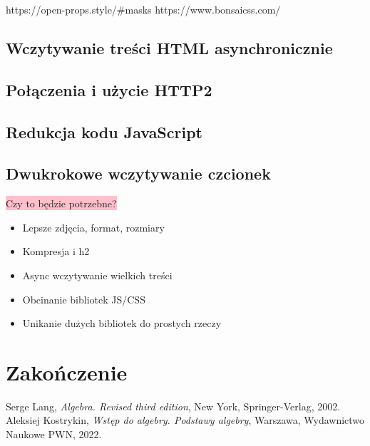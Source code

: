 \documentclass[licencjacka]{pracadypl}
\newcommand{\selfnote}[1]{\colorbox{pink}{#1}}
\begin{document}
https://open-props.style/\#masks
https://www.bonsaicss.com/




\section{Wczytywanie treści HTML asynchronicznie}






\section{Połączenia i użycie HTTP2}






\section{Redukcja kodu JavaScript}


\section{Dwukrokowe wczytywanie czcionek}
\selfnote{Czy to będzie potrzebne?}


\vspace{5em}

\begin{itemize}
  \item Lepsze zdjęcia, format, rozmiary
  \item Kompresja i h2
  \item Async wczytywanie wielkich treści
  \item Obcinanie bibliotek JS/CSS
  \item Unikanie dużych bibliotek do prostych rzeczy
\end{itemize}


\chapter{Zakończenie}


\begin{thebibliography}{7}
%
Serge Lang, 
\textit{Algebra. Revised third edition}, 
New York, Springer-Verlag, 2002.
%
Aleksiej Kostrykin, 
\textit{Wstęp do algebry. Podstawy algebry},
Warszawa, Wydawnictwo Naukowe PWN, 2022.
\end{thebibliography}
\end{document}
